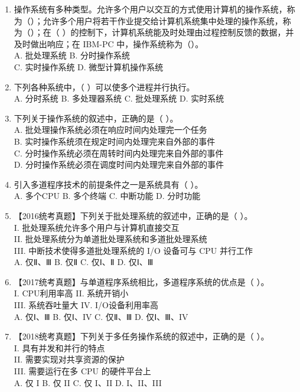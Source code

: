 \documentclass[lang=cn,newtx,10pt,scheme=chinese]{../../elegantbook}
\begin{document}
\begin{enumerate}
  \item 操作系统有多种类型。允许多个用户以交互的方式使用计算机的操作系统，称为（）；允许多个用户将若干作业提交给计算机系统集中处理的操作系统，称为（）；在（ ）的控制下，计算机系统能及时处理由过程控制反馈的数据，并及时做出响应；在 IBM-PC 中，操作系统称为（）。\\
  A. 批处理系统 \quad B. 分时操作系统\\
  C. 实时操作系统 \quad D. 微型计算机操作系统

  \item 下列各种系统中，（ ）可以使多个进程并行执行。\\
  A. 分时系统 \quad B. 多处理器系统 \quad C. 批处理系统 \quad D. 实时系统

  \item 下列关于操作系统的叙述中，正确的是（ ）。\\
  A. 批处理操作系统必须在响应时间内处理完一个任务\\
  B. 实时操作系统须在规定时间内处理完来自外部的事件\\
  C. 分时操作系统必须在周转时间内处理完来自外部的事件\\
  D. 分时操作系统必须在调度时间内处理完来自外部的事件

  \item 引入多道程序技术的前提条件之一是系统具有（ ）。\\
  A. 多个CPU \quad B. 多个终端 \quad C. 中断功能 \quad D. 分时功能

  \item 【2016统考真题】下列关于批处理系统的叙述中，正确的是（ ）。\\
  I. 批处理系统允许多个用户与计算机直接交互\\
  II. 批处理系统分为单道批处理系统和多道批处理系统\\
  III. 中断技术使得多道批处理系统的 I/O 设备可与 CPU 并行工作\\
  A. 仅Ⅱ、Ⅲ \quad B. 仅Ⅱ \quad C. 仅Ⅰ、Ⅱ \quad D. 仅Ⅰ、Ⅲ

  \item 【2017统考真题】与单道程序系统相比，多道程序系统的优点是（ ）。\\
  I. CPU利用率高 \quad II. 系统开销小\\
  III. 系统吞吐量大 \quad IV. I/O设备利用率高\\
  A. 仅Ⅰ、Ⅲ \quad B. 仅Ⅰ、IV \quad C. 仅Ⅱ、Ⅲ \quad D. 仅Ⅰ、Ⅲ、IV
  \item 【2018统考真题】下列关于多任务操作系统的叙述中，正确的是（ ）。\\
  I. 具有并发和并行的特点\\
  II. 需要实现对共享资源的保护\\
  III. 需要运行在多 CPU 的硬件平台上\\
  A. 仅 I \quad B. 仅 II \quad C. 仅 I、II \quad D. I、II、III


\end{enumerate}
\end{document}
